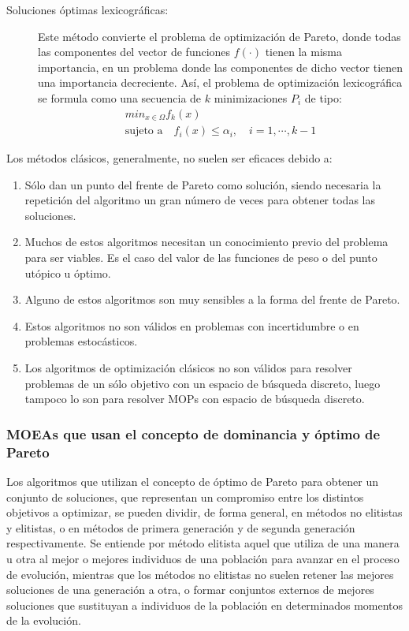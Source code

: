 \begin{description}
\begin{displaymath}
\end{displaymath}
\item [Soluciones óptimas lexicográficas:] Este método convierte el problema de
optimización de Pareto, donde todas las componentes del vector de funciones $f(\cdot)$
tienen la misma importancia, en un problema donde las componentes de dicho vector tienen
una importancia decreciente. Así, el problema de optimización lexicográfica se formula
como una secuencia de $k$ minimizaciones $P_{i}$ de tipo:
\begin{gather} \nonumber
min_{x\in\Omega} f_{k}(x)\\ \nonumber
\text{sujeto a} \quad f_{i}(x)\leq\alpha_{i}, \quad i=1,\cdots,k-1 \nonumber
\end{gather}
\end{description}

Los métodos clásicos, generalmente, no suelen ser eficaces debido a:
\begin{enumerate}
\item Sólo dan un punto del frente de Pareto como solución, siendo
necesaria la repetición del algoritmo un gran número de veces para obtener todas las
soluciones.
\item Muchos de estos algoritmos necesitan un conocimiento previo del problema para
ser viables. Es el caso del valor de las funciones de peso o del punto utópico u óptimo.
\item Alguno de estos algoritmos son muy sensibles a la forma del frente de Pareto.
\item Estos algoritmos no son válidos en problemas con incertidumbre o en problemas
estocásticos.
\item Los algoritmos de optimización clásicos no son válidos para resolver problemas de
un sólo objetivo con un espacio de búsqueda discreto, luego tampoco lo son para resolver
MOPs con espacio de búsqueda discreto.
\end{enumerate}

\subsubsection{MOEAs que usan el concepto de dominancia y óptimo de Pareto}
\noindent Los algoritmos que utilizan el concepto de óptimo de Pareto para obtener un
conjunto de soluciones, que representan un compromiso entre los distintos objetivos a
optimizar, se pueden dividir, de forma general, en métodos no elitistas y elitistas, o
en
métodos de primera generación y de segunda generación respectivamente. Se entiende por
método elitista aquel que utiliza de una manera u otra al mejor o mejores individuos de
una población para avanzar en el proceso de evolución, mientras que los métodos no
elitistas no suelen retener las mejores soluciones de una generación a otra, o formar
conjuntos externos de mejores soluciones que sustituyan a individuos de la población en
determinados momentos de la evolución.

